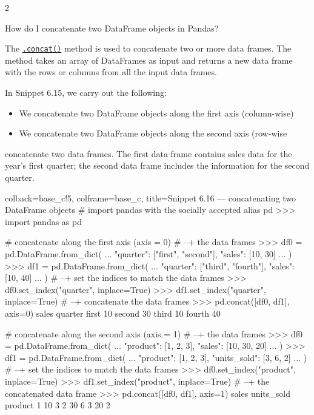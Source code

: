 \documentclass[a4paper,11pt]{book}
\newcommand{\question}[1]{%
    \begin{tcolorbox}[colback=comp_c!10,colframe=comp_c,sidebyside align=top,width=\linewidth,before skip=1ex]
        #1
    \end{tcolorbox}
    \switchcolumn%
}
\newcommand{\note}[1]{%
    \begin{tcolorbox}[colback=white!0,colframe=white!10,width=\linewidth,before skip=1ex]
        #1
    \end{tcolorbox}
}
\begin{document}
\begin{paracol}{2}
	\question{\raggedright How do I concatenate two DataFrame objects in Pandas?}
	\note{The \href{https://pandas.pydata.org/docs/reference/api/pandas.concat.html?highlight=concat\#pandas.concat}{\texttt{.concat()}} method is used to concatenate two or more data frames. The method takes an array of DataFrames as input and returns a new data frame with the rows or columns from all the input data frames.
	
	\quad In Snippet 6.15, we carry out the following:
	
	\begin{itemize}
		\item We concatenate two DataFrame objects along the first axis (column-wise)
		\item We concatenate two DataFrame objects along the second axis (row-wise
	\end{itemize}
	
	\quad concatenate two data frames. The first data frame contains sales data for the year's first quarter; the second data frame includes the information for the second quarter.
	}
\end{paracol}

\begin{pythoncode}[linenos=True]{colback=base_c!5, colframe=base_c, title=\sffamily Snippet 6.16 --- concatenating two DataFrame objects}
# import pandas with the socially accepted alias pd
>>> import pandas as pd

# concatenate along the first axis (axis = 0)
# --+ the data frames
>>> df0 = pd.DataFrame.from_dict(
... 	{"quarter": ["first", "second"], "sales": [10, 30]}
...     )
>>> df1 = pd.DataFrame.from_dict(
... 	{"quarter": ["third", "fourth"], "sales": [10, 40]}
...     )
# --+ set the indices to match the data frames
>>> df0.set_index("quarter", inplace=True)
>>> df1.set_index("quarter", inplace=True)
# --+ concatenate the data frames
>>> pd.concat([df0, df1], axis=0)
         sales
quarter       
first       10
second      30
third       10
fourth      40

# concatenate along the second axis (axis = 1)
# --+ the data frames
>>> df0 = pd.DataFrame.from_dict(
... 	{"product": [1, 2, 3], "sales": [10, 30, 20]}
...     )
>>> df1 = pd.DataFrame.from_dict(
... 	{"product": [1, 2, 3], "units_sold": [3, 6, 2]}
...     )
# --+ set the indices to match the data frames
>>> df0.set_index("product", inplace=True)
>>> df1.set_index("product", inplace=True)
# --+ the concatenated data frame
>>> pd.concat([df0, df1], axis=1)
         sales  units_sold
product                   
1           10           3
2           30           6
3           20           2
\end{pythoncode}
\end{document}
